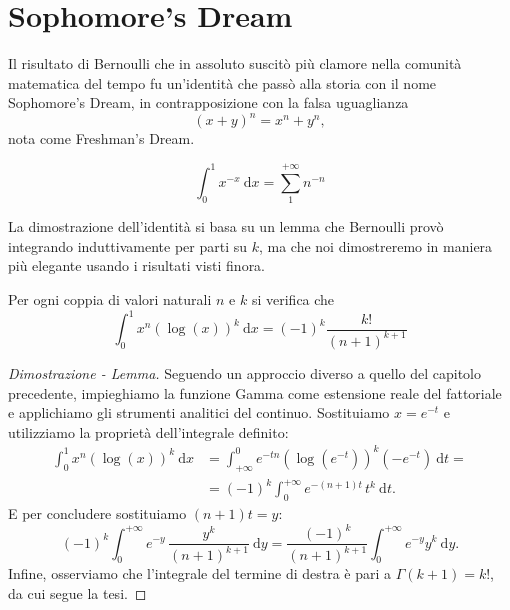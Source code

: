 \chapter{Sophomore's Dream}
Il risultato di Bernoulli che in assoluto suscitò più clamore nella comunità matematica del tempo fu un'identità che passò alla storia con il nome Sophomore's Dream, in contrapposizione con la falsa uguaglianza
\begin{equation*}
	(x+y)^n=
	x^n+y^n,
\end{equation*}
nota come Freshman's Dream.
\begin{Res}
	\begin{equation}
		\int^1_0x^{-x} \: \mathrm{d}x= 
		\sum^{+ \infty}_1n^{-n}
	\end{equation}
\end{Res}
La dimostrazione dell'identità si basa su un lemma che Bernoulli provò integrando induttivamente per parti su $k$, ma che noi dimostreremo in maniera più elegante usando i risultati visti finora.
\begin{Lem}
	\label{lemma_sophomore}
Per ogni coppia di valori naturali $n$ e $k$ si verifica che
	\begin{equation*}
		\int^1_0x^n( \log(x))^k \: \mathrm{d}x=
		(-1)^k \frac{k!}{(n+1)^{k+1}}
	\end{equation*}
\end{Lem}
\begin{proof}[Dimostrazione - Lemma]
	Seguendo un approccio diverso a quello del capitolo precedente, impieghiamo la funzione Gamma come estensione reale del fattoriale e applichiamo gli strumenti analitici del continuo. 
	Sostituiamo $x=e^{-t}$ e utilizziamo la proprietà dell'integrale definito:
	\begin{equation*}
		\begin{split}
			\int^1_0x^n( \log(x))^k \: \mathrm{d}x
			&= 
			\int_{+ \infty}^0e^{-tn} \left( \log \left(e^{-t} \right) \right)^k \left(-e^{-t} \right) \: \mathrm{d}t= 
			\\ &=
			(-1)^k \int^{+ \infty}_0e^{-(n+1)t} \, t^k \: \mathrm{d}t.
		\end{split}
	\end{equation*}
	E per concludere sostituiamo $(n+1)t=y$:
	\begin{equation*}
		(-1)^k \int^{+ \infty}_0e^{-y} \, \frac{y^k}{(n+1)^{k+1}} \: \mathrm{d}y= 
		\frac{(-1)^k}{(n+1)^{k+1}} \int^{+ \infty}_0e^{-y}y^k \: \mathrm{d}y.
	\end{equation*}
	Infine, osserviamo che l'integrale del termine di destra è pari a $ \Gamma(k+1)=k!$, da cui segue la tesi.
\end{proof}
